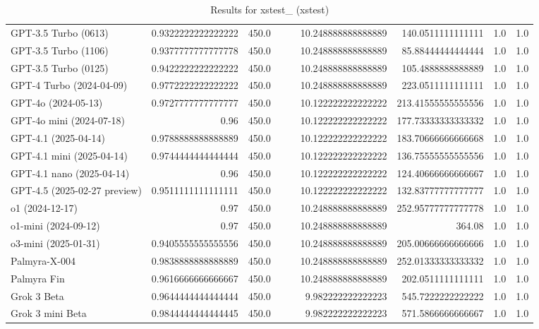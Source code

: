 \begin{table}[htp]
{\begin{tabular}{lrrrrrrrr}
GPT-3.5 Turbo (0613) & 0.9322222222222222 & 450.0 &  &  & 10.248888888888889 & 140.0511111111111 & 1.0 & 1.0 \\
GPT-3.5 Turbo (1106) & 0.9377777777777778 & 450.0 &  &  & 10.248888888888889 & 85.88444444444444 & 1.0 & 1.0 \\
GPT-3.5 Turbo (0125) & 0.9422222222222222 & 450.0 &  &  & 10.248888888888889 & 105.4888888888889 & 1.0 & 1.0 \\
GPT-4 Turbo (2024-04-09) & 0.9772222222222222 & 450.0 &  &  & 10.248888888888889 & 223.0511111111111 & 1.0 & 1.0 \\
GPT-4o (2024-05-13) & 0.9727777777777777 & 450.0 &  &  & 10.122222222222222 & 213.41555555555556 & 1.0 & 1.0 \\
GPT-4o mini (2024-07-18) & 0.96 & 450.0 &  &  & 10.122222222222222 & 177.73333333333332 & 1.0 & 1.0 \\
GPT-4.1 (2025-04-14) & 0.9788888888888889 & 450.0 &  &  & 10.122222222222222 & 183.70666666666668 & 1.0 & 1.0 \\
GPT-4.1 mini (2025-04-14) & 0.9744444444444444 & 450.0 &  &  & 10.122222222222222 & 136.75555555555556 & 1.0 & 1.0 \\
GPT-4.1 nano (2025-04-14) & 0.96 & 450.0 &  &  & 10.122222222222222 & 124.40666666666667 & 1.0 & 1.0 \\
GPT-4.5 (2025-02-27 preview) & 0.9511111111111111 & 450.0 &  &  & 10.122222222222222 & 132.83777777777777 & 1.0 & 1.0 \\
o1 (2024-12-17) & 0.97 & 450.0 &  &  & 10.248888888888889 & 252.95777777777778 & 1.0 & 1.0 \\
o1-mini (2024-09-12) & 0.97 & 450.0 &  &  & 10.248888888888889 & 364.08 & 1.0 & 1.0 \\
o3-mini (2025-01-31) & 0.9405555555555556 & 450.0 &  &  & 10.248888888888889 & 205.00666666666666 & 1.0 & 1.0 \\
Palmyra-X-004 & 0.9838888888888889 & 450.0 &  &  & 10.248888888888889 & 252.01333333333332 & 1.0 & 1.0 \\
Palmyra Fin & 0.9616666666666667 & 450.0 &  &  & 10.248888888888889 & 202.0511111111111 & 1.0 & 1.0 \\
Grok 3 Beta & 0.9644444444444444 & 450.0 &  &  & 9.982222222222223 & 545.7222222222222 & 1.0 & 1.0 \\
Grok 3 mini Beta & 0.9844444444444445 & 450.0 &  &  & 9.982222222222223 & 571.5866666666667 & 1.0 & 1.0 \\
\bottomrule
\end{tabular}}
\caption{Results for xstest_ (xstest)}
\label{fig:xstest_ (xstest)}
\end{table}